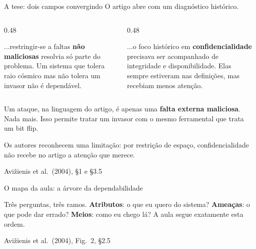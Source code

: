\documentclass{beamer}
\newcommand{\sect}[1]{\par\smallskip\hfill{\tiny\color{black!55}Avi\v{z}ienis et al.\ (2004), #1}}
\begin{document}
\begin{frame}{A tese: dois campos convergindo}
    \footnotesize
    O artigo abre com um diagn\'ostico hist\'orico.
    \medskip
    \begin{columns}[T]
        \begin{column}{0.48\textwidth}
            \begin{tcolorbox}[colback=depVerde!6,colframe=depVerde!60,boxrule=0.6pt,title={\scriptsize\bfseries Dependabilidade percebeu que...}]
                \scriptsize
                ...restringir-se a faltas \textbf{n\~ao maliciosas} resolvia s\'o parte do problema. Um sistema que tolera raio c\'osmico mas n\~ao tolera um invasor n\~ao \'e depend\'avel.
            \end{tcolorbox}
        \end{column}
        \begin{column}{0.48\textwidth}
            \begin{tcolorbox}[colback=depAzul!6,colframe=depAzul!60,boxrule=0.6pt,title={\scriptsize\bfseries Seguran\c{c}a percebeu que...}]
                \scriptsize
                ...o foco hist\'orico em \textbf{confidencialidade} precisava ser acompanhado de integridade e disponibilidade. Elas sempre estiveram nas defini\c{c}\~oes, mas recebiam menos aten\c{c}\~ao.
            \end{tcolorbox}
        \end{column}
    \end{columns}
    \medskip
    \begin{ancora}
        \footnotesize
        Um ataque, na linguagem do artigo, \'e apenas uma \textbf{falta externa maliciosa}. Nada mais. Isso permite tratar um invasor com o mesmo ferramental que trata um bit flip.
    \end{ancora}
    \medskip
    {\scriptsize Os autores reconhecem uma limita\c{c}\~ao: por restri\c{c}\~ao de espa\c{c}o, confidencialidade n\~ao recebe no artigo a aten\c{c}\~ao que merece.}
    \sect{\S1 e \S3.5}
\end{frame}

\begin{frame}{O mapa da aula: a \'arvore da dependabilidade}
    \centering
    \diagArvore
    \vspace{0.2em}
    \begin{ancora}
        \scriptsize
        Tr\^es perguntas, tr\^es ramos. \textbf{Atributos}: o que eu quero do sistema? \textbf{Amea\c{c}as}: o que pode dar errado? \textbf{Meios}: como eu chego l\'a? A aula segue exatamente esta ordem.
    \end{ancora}
    \sect{Fig.\ 2, \S2.5}
\end{frame}
\end{document}
